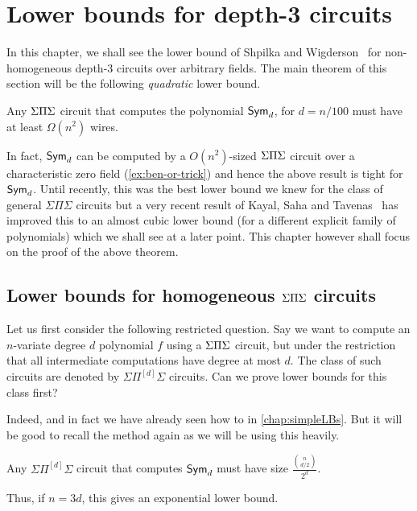 \chapter{Lower bounds for depth-3 circuits}\label{chap:d3SW}

In this chapter, we shall see the lower bound of Shpilka and Wigderson~\cite{sw2001} for non-homogeneous depth-$3$ circuits over arbitrary fields.
The main theorem of this section will be the following \emph{quadratic} lower bound.

\begin{theorem}[\cite{sw2001}]\label{thm:SW-SPS-main-thm}
Any $\Sigma\Pi\Sigma$ circuit that computes the polynomial $\operatorname{\mathsf{Sym}}_d$, for $d = n/100$ must have at least $\Omega(n^2)$ wires. 
\end{theorem}

In fact, $\operatorname{\mathsf{Sym}}_d$ can be computed by a $O(n^2)$-sized  $\Sigma\Pi\Sigma$ circuit over a characteristic zero field (\autoref{ex:ben-or-trick}) and hence the above result is tight for $\operatorname{\mathsf{Sym}}_d$.
Until recently, this was the best lower bound we knew for the class of general $\Sigma\Pi\Sigma$ circuits but a very recent result of Kayal, Saha and Tavenas~\cite{kst16} has improved this to an almost cubic lower bound (for a different explicit family of polynomials) which we shall see at a later point.
This chapter however shall focus on the proof of the above theorem.

\section{Lower bounds for homogeneous $\Sigma\Pi\Sigma$ circuits \cite{nw1997}}

Let us first consider the following restricted question.
Say we want to compute an $n$-variate degree $d$ polynomial $f$ using a $\Sigma\Pi\Sigma$ circuit, but under the restriction that all intermediate computations have degree at most $d$.
The class of such circuits are denoted by $\Sigma\Pi^{[d]}\Sigma$ circuits.
Can we prove lower bounds for this class first?

Indeed, and in fact we have already seen how to in \autoref{chap:simpleLBs}. But it will be good to recall the method again as we will be using this heavily.

\begin{theorem}[\cite{nw1997}]
Any $\Sigma\Pi^{[d]}\Sigma$ circuit that computes $\operatorname{\mathsf{Sym}}_d$ must have size $\frac{\binom{n}{d/2}}{2^d}$. 
\end{theorem}
Thus, if $n = 3d$, this gives an exponential lower bound. 

